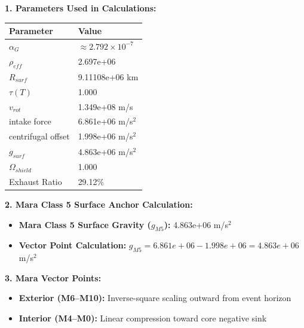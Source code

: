 \documentclass[11pt, a4paper]{article}
\begin{document}
\vspace{0.5em}
\noindent \textbf{1. Parameters Used in Calculations:}
\begin{center}
  \begin{tabular}{|l|l|}
    \hline
    \textbf{Parameter} & \textbf{Value} \\ \hline
    $\alpha_G$ & $\approx 2.792 \times 10^{-7}$ \\ \hline
    $\rho_{eff}$ & 2.697e+06 \\ \hline
    $R_{surf}$ & 9.11108e+06 km \\ \hline
    $\tau(T)$ & 1.000 \\ \hline
    $v_{rot}$ & 1.349e+08 m/s \\ \hline
    intake force & 6.861e+06 m/s$^2$ \\ \hline
    centrifugal offset & 1.998e+06 m/s$^2$ \\ \hline
    $g_{surf}$ & 4.863e+06 m/s$^2$ \\ \hline
    $\Omega_{shield}$ & 1.000 \\ \hline
    Exhaust Ratio & 29.12\% \\ \hline
  \end{tabular}
\end{center}

\vspace{0.5em}
\noindent \textbf{2. Mara Class 5 Surface Anchor Calculation:}
\begin{itemize}
  \item \textbf{Mara Class 5 Surface Gravity ($g_{M5}$):} 4.863e+06 m/s$^2$
  \item \textbf{Vector Point Calculation:} $g_{M5} = 6.861e+06 - 1.998e+06 = 4.863e+06$ m/s$^2$
\end{itemize}

\vspace{0.5em}
\noindent \textbf{3. Mara Vector Points:}
\begin{itemize}
  \item \textbf{Exterior (M6--M10):} Inverse-square scaling outward from event horizon
  \item \textbf{Interior (M4--M0):} Linear compression toward core negative sink
\end{itemize}
\end{document}
